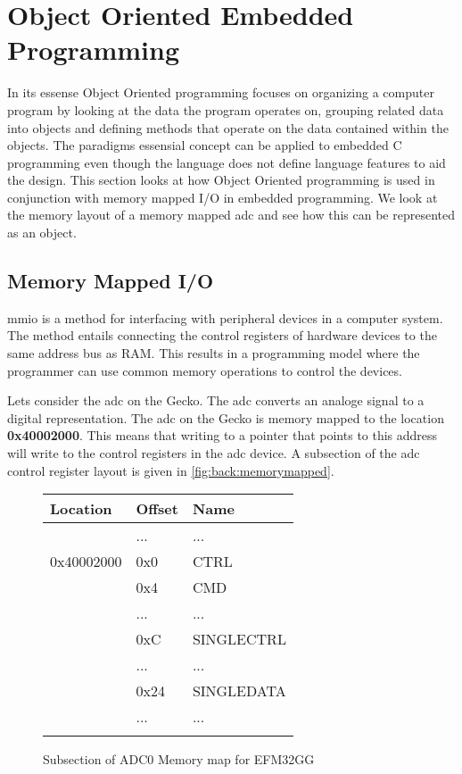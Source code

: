 \section{Object Oriented Embedded Programming}
\label{sec:back:oo}

In its essense Object Oriented programming focuses on organizing a computer program by looking at the data the program operates on, grouping related data into objects and defining methods that operate on the data contained within the objects.
The paradigms essensial concept can be applied to embedded C programming even though the language does not define language features to aid the design.
This section looks at how Object Oriented programming is used in conjunction with memory mapped I/O in embedded programming.
We look at the memory layout of a memory mapped \gls{adc} and see how this can be represented as an object.

\subsection{Memory Mapped I/O}
\gls{mmio} is a method for interfacing with peripheral devices in a computer system.
The method entails connecting the control registers of hardware devices to the same address bus as RAM.
This results in a programming model where the programmer can use common memory operations to control the devices.

Lets consider the \gls{adc} on the Gecko.
The \gls{adc} converts an analoge signal to a digital representation.
The \gls{adc} on the Gecko is memory mapped to the location \textbf{0x40002000}.
This means that writing to a pointer that points to this address will write to the control registers in the \gls{adc} device.
A subsection of the \gls{adc} control register layout is given in \autoref{fig:back:memorymapped}.
\begin{figure}[H]
  \centering
  \begin{tabular}{l|l|l|}
    Location&Offset&Name\\
    \hline
    &...&...\\
    \hline
    \hline
    0x40002000&0x0&CTRL\\
    \hline
    &0x4&CMD\\
    \hline
    &...&...\\
    \hline
    &0xC&SINGLECTRL\\
    \hline
    &...&...\\
    \hline
    &0x24&SINGLEDATA\\
    \hline
    &...&...\\
    \hline
    \hline
    &&\\
  \end{tabular}
  \caption{Subsection of ADC0 Memory map for EFM32GG}
  \label{fig:back:memorymapped}
\end{figure}

